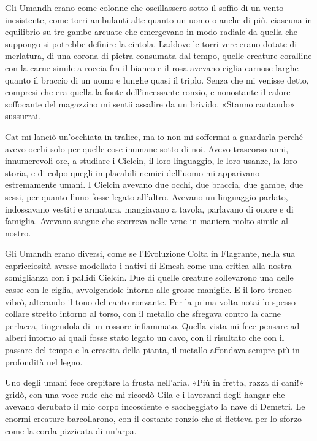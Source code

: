 Gli Umandh erano come colonne che oscillassero sotto il soffio di un
vento inesistente, come torri ambulanti alte quanto un uomo o anche di
più, ciascuna in equilibrio su tre gambe arcuate che emergevano in modo
radiale da quella che suppongo si potrebbe definire la cintola. Laddove
le torri vere erano dotate di merlatura, di una corona di pietra
consumata dal tempo, quelle creature coralline con la carne simile a
roccia fra il bianco e il rosa avevano ciglia carnose larghe quanto il
braccio di un uomo e lunghe quasi il triplo. Senza che mi venisse detto,
compresi che era quella la fonte dell'incessante ronzio, e nonostante il
calore soffocante del magazzino mi sentii assalire da un brivido.
«Stanno cantando» sussurrai.

Cat mi lanciò un'occhiata in tralice, ma io non mi soffermai a guardarla
perché avevo occhi solo per quelle cose inumane sotto di noi. Avevo
trascorso anni, innumerevoli ore, a studiare i Cielcin, il loro
linguaggio, le loro usanze, la loro storia, e di colpo quegli
implacabili nemici dell'uomo mi apparivano estremamente umani. I Cielcin
avevano due occhi, due braccia, due gambe, due sessi, per quanto l'uno
fosse legato all'altro. Avevano un linguaggio parlato, indossavano
vestiti e armatura, mangiavano a tavola, parlavano di onore e di
famiglia. Avevano sangue che scorreva nelle vene in maniera molto simile
al nostro.

Gli Umandh erano diversi, come se l'Evoluzione Colta in Flagrante, nella
sua capricciosità avesse modellato i nativi di Emesh come una critica
alla nostra somiglianza con i pallidi Cielcin. Due di quelle creature
sollevarono una delle casse con le ciglia, avvolgendole intorno alle
grosse maniglie. E il loro tronco vibrò, alterando il tono del canto
ronzante. Per la prima volta notai lo spesso collare stretto intorno al
torso, con il metallo che sfregava contro la carne perlacea, tingendola
di un rossore infiammato. Quella vista mi fece pensare ad alberi intorno
ai quali fosse stato legato un cavo, con il risultato che con il passare
del tempo e la crescita della pianta, il metallo affondava sempre più in
profondità nel legno.

Uno degli umani fece crepitare la frusta nell'aria. «Più in fretta,
razza di cani!» gridò, con una voce rude che mi ricordò Gila e i
lavoranti degli hangar che avevano derubato il mio corpo incosciente e
saccheggiato la nave di Demetri. Le enormi creature barcollarono, con il
costante ronzio che si fletteva per lo sforzo come la corda pizzicata di
un'arpa.

